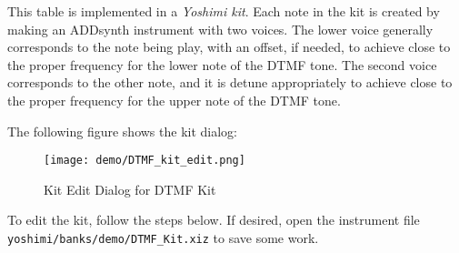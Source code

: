    This table is implemented in a \textsl{Yoshimi kit}.  Each note in the
   kit is created by making an ADDsynth instrument with two voices.  The
   lower voice generally corresponds to the note being play, with an offset,
   if needed, to achieve close to the proper frequency for the lower note of
   the DTMF tone.
   The second voice corresponds to the other note, and it is detune
   appropriately to achieve close to the proper frequency for the upper note
   of the DTMF tone.

   The following figure shows the kit dialog:

\begin{figure}[H]
   \centering 
   \texttt{[image: demo/DTMF\_kit\_edit.png]}
   \caption{Kit Edit Dialog for DTMF Kit}
   \label{fig:cookbook_instruments_dtmf_kit_edit}
\end{figure}

   To edit the kit, follow the steps below.  If desired, open the
   instrument file
   \texttt{yoshimi/banks/demo/DTMF\_Kit.xiz} to save some
   work.

